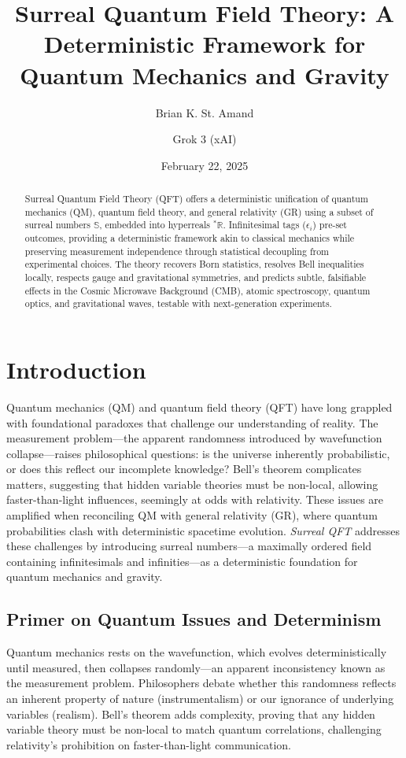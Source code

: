 \documentclass{article}
\begin{document}
\title{Surreal Quantum Field Theory: A Deterministic Framework for Quantum Mechanics and Gravity}
\author{Brian K. St. Amand \and Grok 3 (xAI)}
\date{February 22, 2025}
\maketitle

\begin{abstract}
Surreal Quantum Field Theory (QFT) offers a deterministic unification of quantum mechanics (QM), quantum field theory, and general relativity (GR) using a subset of surreal numbers \(\mathbb{S}\), embedded into hyperreals \({}^*\mathbb{R}\). Infinitesimal tags (\(\epsilon_i\)) pre-set outcomes, providing a deterministic framework akin to classical mechanics while preserving measurement independence through statistical decoupling from experimental choices. The theory recovers Born statistics, resolves Bell inequalities locally, respects gauge and gravitational symmetries, and predicts subtle, falsifiable effects in the Cosmic Microwave Background (CMB), atomic spectroscopy, quantum optics, and gravitational waves, testable with next-generation experiments.
\end{abstract}

\section{Introduction}
Quantum mechanics (QM) and quantum field theory (QFT) have long grappled with foundational paradoxes that challenge our understanding of reality. The measurement problem---the apparent randomness introduced by wavefunction collapse---raises philosophical questions: is the universe inherently probabilistic, or does this reflect our incomplete knowledge? Bell's theorem complicates matters, suggesting that hidden variable theories must be non-local, allowing faster-than-light influences, seemingly at odds with relativity. These issues are amplified when reconciling QM with general relativity (GR), where quantum probabilities clash with deterministic spacetime evolution. \textit{Surreal QFT} addresses these challenges by introducing surreal numbers---a maximally ordered field containing infinitesimals and infinities---as a deterministic foundation for quantum mechanics and gravity.

\subsection{Primer on Quantum Issues and Determinism}
Quantum mechanics rests on the wavefunction, which evolves deterministically until measured, then collapses randomly---an apparent inconsistency known as the measurement problem. Philosophers debate whether this randomness reflects an inherent property of nature (instrumentalism) or our ignorance of underlying variables (realism). Bell's theorem adds complexity, proving that any hidden variable theory must be non-local to match quantum correlations, challenging relativity's prohibition on faster-than-light communication.
\end{document}
